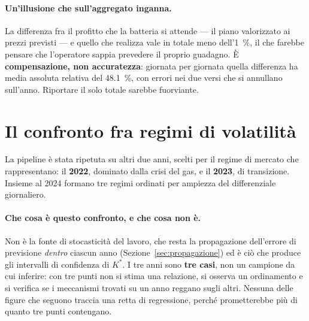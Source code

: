 \paragraph{Un'illusione che sull'aggregato inganna.} La differenza fra il profitto che la
batteria si attende --- il piano valorizzato ai prezzi previsti --- e quello che realizza vale
in totale meno dell'\SI{1}{\percent}, il che farebbe pensare che l'operatore sappia prevedere
il proprio guadagno. \`E \textbf{compensazione, non accuratezza}: giornata per giornata quella
differenza ha media assoluta relativa del \SI{48,1}{\percent}, con errori nei due versi che si
annullano sull'anno. Riportare il solo totale sarebbe fuorviante.

\section{Il confronto fra regimi di volatilit\`a}
\label{sec:confronto-regimi}

La pipeline \`e stata ripetuta su altri due anni, scelti per il regime di mercato che
rappresentano: il \textbf{2022}, dominato dalla crisi del gas, e il \textbf{2023}, di
transizione. Insieme al 2024 formano tre regimi ordinati per ampiezza del differenziale
giornaliero.

\paragraph{Che cosa \`e questo confronto, e che cosa non \`e.} Non \`e la fonte di
stocasticit\`a del lavoro, che resta la propagazione dell'errore di previsione \emph{dentro}
ciascun anno (Sezione~\ref{sec:propagazione}) ed \`e ci\`o che produce gli intervalli di
confidenza di $K^*$. I tre anni sono \textbf{tre casi}, non un campione da cui inferire: con
tre punti non si stima una relazione, si osserva un ordinamento e si verifica se i meccanismi
trovati su un anno reggano sugli altri. Nessuna delle figure che seguono traccia una retta di
regressione, perch\'e prometterebbe pi\`u di quanto tre punti contengano.

